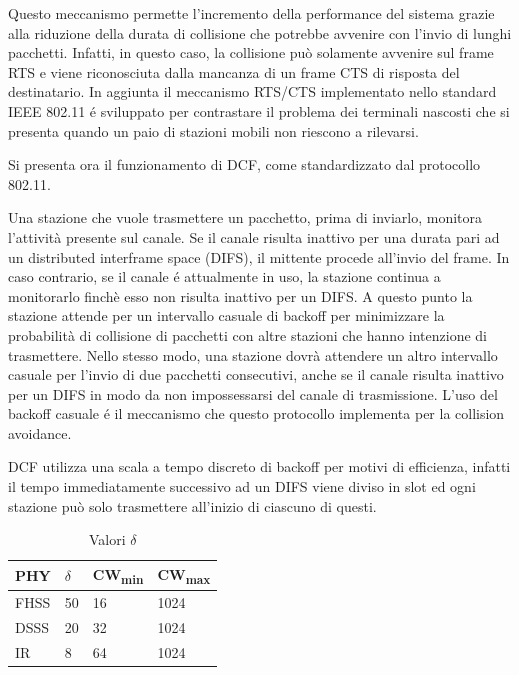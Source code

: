 Questo meccanismo permette l'incremento della performance del sistema grazie alla riduzione della durata di collisione che potrebbe avvenire con l'invio di lunghi pacchetti.
Infatti, in questo caso, la collisione pu\`o solamente avvenire sul frame RTS e viene riconosciuta dalla mancanza di un frame CTS di risposta del destinatario.
In aggiunta il meccanismo RTS/CTS implementato nello standard IEEE 802.11 \'e sviluppato per contrastare il problema dei terminali nascosti \cite{tobagi1975packet} che si presenta quando un paio di stazioni mobili non riescono a rilevarsi. %

Si presenta ora il funzionamento di DCF, come standardizzato dal protocollo 802.11.

Una stazione che vuole trasmettere un pacchetto, prima di inviarlo, monitora l'attivit\`a presente sul canale.
Se il canale risulta inattivo per una durata pari ad un distributed interframe space (DIFS), il mittente procede all'invio del frame.
In caso contrario, se il canale \'e attualmente in uso, la stazione continua a monitorarlo finch\`e esso non risulta inattivo per un DIFS.
A questo punto la stazione attende per un intervallo casuale di backoff per minimizzare la probabilit\`a di collisione di pacchetti con altre stazioni che hanno intenzione di trasmettere.
Nello stesso modo, una stazione dovr\`a attendere un altro intervallo casuale per l'invio di due pacchetti consecutivi, anche se il canale risulta inattivo per un DIFS in modo da non impossessarsi del canale di trasmissione.
L'uso del backoff casuale \'e il meccanismo che questo protocollo implementa per la collision avoidance.

DCF utilizza una scala a tempo discreto di backoff per motivi di efficienza, infatti il tempo immediatamente successivo ad un DIFS viene diviso in slot ed ogni stazione pu\`o solo trasmettere all'inizio di ciascuno di questi.
\begin{table}
\centering
\begin{tabular}{| l | l | l | l |}
	\hline 
	PHY & $\delta$ & CW\textsubscript{min} & CW\textsubscript{max} \\ \hline
	FHSS & 50 & 16 & 1024 \\ \hline
	DSSS & 20 & 32 & 1024 \\ \hline
	IR &8 & 64 & 1024 \\ 
	\hline
\end{tabular}
\caption{Valori $\delta$}
\label{table:deltavalues}
\end{table}


